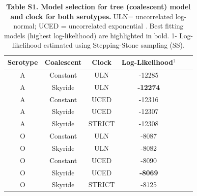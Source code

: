 \documentclass[a4paper,10pt]{article}
\begin{document}
\begin{table}[ht]
\caption*{\textbf{Table S1. Model selection for tree (coalescent) model and clock for both serotypes.}
ULN= uncorrelated log-normal; UCED = uncorrelated exponential .
Best fitting models (highest log-likelihood) are highlighted in bold.
1- Log-likelihood estimated using Stepping-Stone sampling (SS).}
\begin{center}
\begin{tabular}{cccccc}
\toprule
Serotype	&Coalescent	&Clock	&Log-Likelihood$^{1}$\\
\midrule
A	&Constant	&ULN	&-12285\\
A	&Skyride 	&ULN	&\textbf{-12274}\\
A	&Constant	&UCED	&-12316\\
A	&Skyride 	&UCED	&-12307\\
A       &Skyride       &STRICT &-12308\\
O	&Constant	&ULN	&-8087\\
O	&Skyride 	&ULN	&-8082\\
O	&Constant	&UCED	&-8090\\
O	&Skyride 	&UCED	&\textbf{-8069}\\
O       &Skyride       &STRICT &-8125\\
\bottomrule
\end{tabular}
\end{center}
\begin{flushleft}
\end{flushleft}
\label{stab:treeclockselection}
 \end{table}
\end{document}
